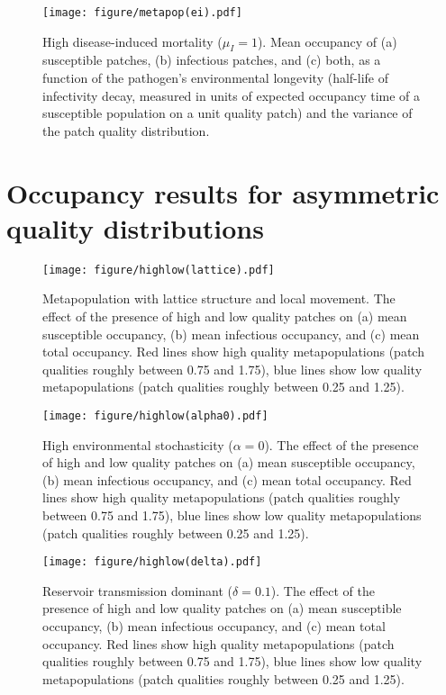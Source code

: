 \documentclass{article}
\begin{document}
\begin{figure}[h!]
\centering
\texttt{[image: figure/metapop(ei).pdf]}
\caption{High disease-induced mortality ($\mu_I = 1$).  Mean occupancy of (a) susceptible patches, (b) infectious patches, and (c) both, as a function of the pathogen's environmental longevity (half-life of infectivity decay, measured in units of expected occupancy time of a susceptible population on a unit quality patch) and the variance of the patch quality distribution.}
\label{poutcome_ei}
\end{figure}   

\clearpage

\section{Occupancy results for asymmetric quality distributions}

\begin{figure}[h!]
\centering
\texttt{[image: figure/highlow(lattice).pdf]}
\caption{Metapopulation with lattice structure and local movement.  The effect of the presence of high and low quality patches on (a) mean susceptible occupancy, (b) mean infectious occupancy, and (c) mean total occupancy.  Red lines show high quality metapopulations (patch qualities roughly between 0.75 and 1.75), blue lines show low quality metapopulations (patch qualities roughly between 0.25 and 1.25).}
\label{sens_lattice}
\end{figure}

\begin{figure}
\centering
\texttt{[image: figure/highlow(alpha0).pdf]}
\caption{High environmental stochasticity ($\alpha = 0$).  The effect of the presence of high and low quality patches on (a) mean susceptible occupancy, (b) mean infectious occupancy, and (c) mean total occupancy.  Red lines show high quality metapopulations (patch qualities roughly between 0.75 and 1.75), blue lines show low quality metapopulations (patch qualities roughly between 0.25 and 1.25).}
\label{sens_x0}
\end{figure}

\begin{figure}
\centering
\texttt{[image: figure/highlow(delta).pdf]}
\caption{Reservoir transmission dominant ($\delta = 0.1$).  The effect of the presence of high and low quality patches on (a) mean susceptible occupancy, (b) mean infectious occupancy, and (c) mean total occupancy.  Red lines show high quality metapopulations (patch qualities roughly between 0.75 and 1.75), blue lines show low quality metapopulations (patch qualities roughly between 0.25 and 1.25).}
\label{sens_delta}
\end{figure}
\end{document}

